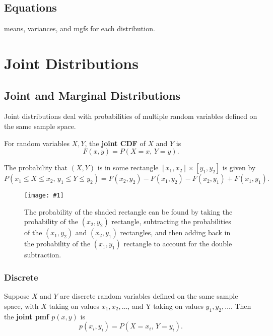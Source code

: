\documentclass[a4paper,10pt]{article}
\newcommand{\fig}[1]{\centerline{\texttt{[image: \#1]}}}
\begin{document}
\subsection{Equations}
means, variances, and mgfs for each distribution. 


\newpage
\section{Joint Distributions}

\subsection{Joint and Marginal Distributions}

Joint distributions deal with probabilities of multiple random variables defined on the same sample space.

For random variables $X, Y$, the \textbf{joint CDF} of $X$ and $Y$ is \begin{equation*}
    F(x, y) = P(X=x,\,Y=y).
\end{equation*}

The probability that $(X, Y)$ is in some rectangle $[x_1, x_2] \times [y_1, y_2]$ is given by 
\begin{equation*}
    P(x_1\leq X\leq x_2,\,y_1\leq Y\leq y_2) = F(x_2, y_2) - F(x_1, y_2) - F(x_2, y_1) + F(x_1, y_1).
\end{equation*}

\begin{figure}[!ht]
    \centering
    \fig{joint}
    \caption{The probability of the shaded rectangle can be found by taking the probability of the $(x_2, y_2)$ rectangle, subtracting the probabilities of the $(x_1, y_2)$ and $(x_2, y_1)$ rectangles, and then adding back in the probability of the $(x_1, y_1)$ rectangle to account for the double subtraction.}
\end{figure}

\subsubsection{Discrete}

Suppose $X$ and $Y$ are discrete random variables defined on the same sample space, with $X$ taking on values $x_1, x_2, \ldots$, and Y taking on values $y_1, y_2, \ldots$. Then the \textbf{joint pmf $p(x, y)$} is 
\begin{equation*}
    p(x_i, y_i) = P(X=x_i,\,Y=y_i).
\end{equation*}
\end{document}
